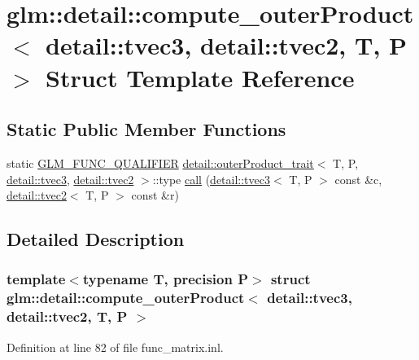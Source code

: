 \hypertarget{structglm_1_1detail_1_1compute__outer_product_3_01detail_1_1tvec3_00_01detail_1_1tvec2_00_01_t_00_01_p_01_4}{}\section{glm\+:\+:detail\+:\+:compute\+\_\+outer\+Product$<$ detail\+:\+:tvec3, detail\+:\+:tvec2, T, P $>$ Struct Template Reference}
\label{structglm_1_1detail_1_1compute__outer_product_3_01detail_1_1tvec3_00_01detail_1_1tvec2_00_01_t_00_01_p_01_4}
\subsection*{Static Public Member Functions}
\begin{DoxyCompactItemize}
\item 
static \hyperlink{setup_8hpp_a33fdea6f91c5f834105f7415e2a64407}{G\+L\+M\+\_\+\+F\+U\+N\+C\+\_\+\+Q\+U\+A\+L\+I\+F\+I\+ER} \hyperlink{structglm_1_1detail_1_1outer_product__trait}{detail\+::outer\+Product\+\_\+trait}$<$ T, P, \hyperlink{structglm_1_1detail_1_1tvec3}{detail\+::tvec3}, \hyperlink{structglm_1_1detail_1_1tvec2}{detail\+::tvec2} $>$\+::type \hyperlink{structglm_1_1detail_1_1compute__outer_product_3_01detail_1_1tvec3_00_01detail_1_1tvec2_00_01_t_00_01_p_01_4_a96862a6cc9a974bd7dcc4068f433ccf5}{call} (\hyperlink{structglm_1_1detail_1_1tvec3}{detail\+::tvec3}$<$ T, P $>$ const \&c, \hyperlink{structglm_1_1detail_1_1tvec2}{detail\+::tvec2}$<$ T, P $>$ const \&r)
\end{DoxyCompactItemize}


\subsection{Detailed Description}
\subsubsection*{template$<$typename T, precision P$>$\newline
struct glm\+::detail\+::compute\+\_\+outer\+Product$<$ detail\+::tvec3, detail\+::tvec2, T, P $>$}



Definition at line 82 of file func\+\_\+matrix.\+inl.



